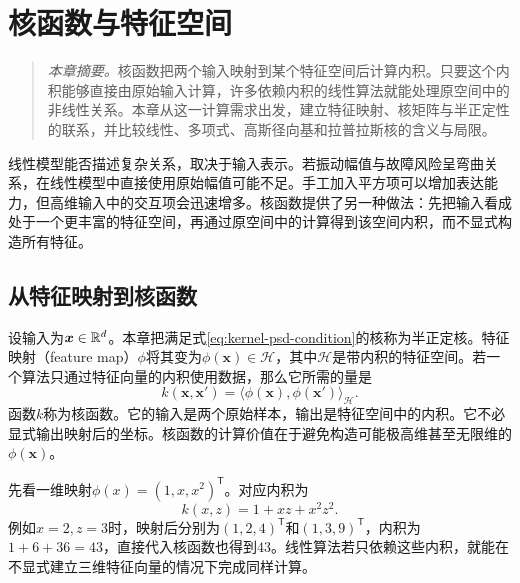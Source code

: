 \chapter{核函数与特征空间}
\label{chap:kernel-functions}
\begin{quote}\small
\textit{本章摘要。}核函数把两个输入映射到某个特征空间后计算内积。只要这个内积能够直接由原始输入计算，许多依赖内积的线性算法就能处理原空间中的非线性关系。本章从这一计算需求出发，建立特征映射、核矩阵与半正定性的联系，并比较线性、多项式、高斯径向基和拉普拉斯核的含义与局限。
\end{quote}

线性模型能否描述复杂关系，取决于输入表示。若振动幅值与故障风险呈弯曲关系，在线性模型中直接使用原始幅值可能不足。手工加入平方项可以增加表达能力，但高维输入中的交互项会迅速增多。核函数提供了另一种做法：先把输入看成处于一个更丰富的特征空间，再通过原空间中的计算得到该空间内积，而不显式构造所有特征。

\section{从特征映射到核函数}
设输入为$\bm x\in\mathbb{R}^d$。本章把满足式\eqref{eq:kernel-psd-condition}的核称为半正定核。特征映射（feature map）$\phi$将其变为$\phi(\bm x)\in\mathcal H$，其中$\mathcal H$是带内积的特征空间。若一个算法只通过特征向量的内积使用数据，那么它所需的量是
\begin{equation}
 k(\bm x,\bm x')=\langle\phi(\bm x),\phi(\bm x')\rangle_{\mathcal H}.
 \label{eq:kernel-feature-inner-product}
\end{equation}
函数$k$称为核函数。它的输入是两个原始样本，输出是特征空间中的内积。它不必显式输出映射后的坐标。核函数的计算价值在于避免构造可能极高维甚至无限维的$\phi(\bm x)$。

先看一维映射$\phi(x)=(1,x,x^2)^{\mathsf T}$。对应内积为
\begin{equation}
 k(x,z)=1+xz+x^2z^2.
\end{equation}
例如$x=2,z=3$时，映射后分别为$(1,2,4)^{\mathsf T}$和$(1,3,9)^{\mathsf T}$，内积为$1+6+36=43$，直接代入核函数也得到$43$。线性算法若只依赖这些内积，就能在不显式建立三维特征向量的情况下完成同样计算。

